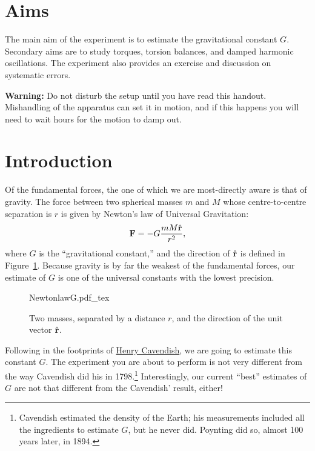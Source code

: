 \documentclass{article}
\begin{document}
\maketitle

\section*{Aims}

The main aim of the experiment is to estimate the gravitational
constant $G$. Secondary aims are to study torques, torsion balances,
and damped harmonic oscillations. The experiment also provides an
exercise and discussion on systematic errors.

\textbf{Warning:} Do not disturb the setup until you have read this
handout. Mishandling of the apparatus can set it in motion, and if
this happens you will need to wait hours for the motion to damp out.




\section*{Introduction}
Of the fundamental forces, the one of which we are most-directly aware
is that of gravity. The force between two spherical masses $m$ and $M$
whose centre-to-centre separation is $r$ is given by Newton's law of
Universal Gravitation:%
\begin{equation}
  {\bf F}=-G\frac{mM\hat{\bf r}}{r^{2}},%
  \label{eq:G}
\end{equation}
where $G$ is the ``gravitational constant,'' and the direction of
$\hat{\bf r}$ is defined in Figure~\ref{fig:mM}. Because gravity is by
far the weakest of the fundamental forces, our estimate of $G$ is one
of the universal constants with the lowest precision.

\begin{figure}[h]
  \centering
  \def\svgwidth{0.5\columnwidth}
  {NewtonlawG.pdf_tex}
  \caption{Two masses, separated by a distance $r$, and the
    direction of the unit vector $\hat{\bf r}$.}
  \label{fig:mM}
\end{figure}

Following in the footprints of
\href{http://en.wikipedia.org/wiki/Henry_Cavendish}{Henry Cavendish},
we are going to estimate this constant $G$.  The experiment you are
about to perform is not very different from the way Cavendish did his
in 1798.\footnote{Cavendish estimated the density of the Earth; his
  measurements included all the ingredients to estimate $G$, but he
  never did. Poynting did so, almost 100 years later, in 1894.}
Interestingly, our current ``best'' estimates of $G$ are not that
different from the Cavendish' result, either!
\end{document}
